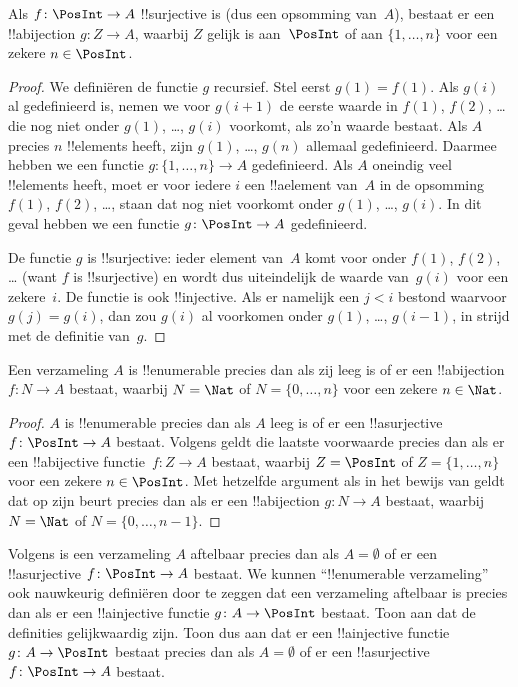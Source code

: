 \documentclass[../../../include/open-logic-section]{subfiles}
\begin{document}
\begin{prop}
Als $f\colon \PosInt \to A$ !!{surjective} is (dus een opsomming
van~$A$), bestaat er een !!a{bijection} $g\colon Z \to A$, waarbij $Z$
gelijk is aan~$\PosInt$ of aan $\{1, \dots, n\}$ voor een zekere
$n \in \PosInt$.
\end{prop}

\begin{proof}
  We definiëren de functie $g$ recursief. Stel eerst $g(1) = f(1)$.
  Als $g(i)$ al gedefinieerd is, nemen we voor $g(i+1)$ de eerste
  waarde in $f(1)$, $f(2)$, \dots{} die nog niet onder $g(1)$, \dots,
  $g(i)$ voorkomt, als zo'n waarde bestaat. Als $A$ precies $n$
  !!{element}s heeft, zijn $g(1)$, \dots, $g(n)$ allemaal gedefinieerd.
  Daarmee hebben we een functie $g\colon \{1, \dots, n\} \to A$
  gedefinieerd. Als $A$ oneindig veel !!{element}s heeft, moet er voor
  iedere $i$ een !!a{element} van~$A$ in de opsomming $f(1)$, $f(2)$,
  \dots, staan dat nog niet voorkomt onder $g(1)$, \dots, $g(i)$.
  In dit geval hebben we een functie $g\colon \PosInt \to A$
  gedefinieerd.
  
  De functie $g$ is !!{surjective}: ieder element van~$A$ komt voor
  onder $f(1)$, $f(2)$, \dots{} (want $f$ is !!{surjective}) en wordt
  dus uiteindelijk de waarde van~$g(i)$ voor een zekere~$i$. De functie
  is ook !!{injective}. Als er namelijk een $j < i$ bestond waarvoor
  $g(j) = g(i)$, dan zou $g(i)$ al voorkomen onder $g(1)$, \dots,
  $g(i-1)$, in strijd met de definitie van~$g$.
\end{proof}

\begin{cor}
Een verzameling $A$ is !!{enumerable} precies dan als zij leeg is of er
een !!a{bijection} $f\colon N \to A$ bestaat, waarbij $N = \Nat$ of
$N = \{0, \dots, n\}$ voor een zekere $n \in \Nat$.
\end{cor}

\begin{proof}
$A$ is !!{enumerable} precies dan als $A$ leeg is of er een
!!a{surjective} $f\colon \PosInt \to A$ bestaat. Volgens
 geldt die laatste voorwaarde precies dan als er
een !!a{bijective} functie~$f\colon Z \to A$ bestaat, waarbij $Z =
\PosInt$ of $Z = \{1, \dots, n\}$ voor een zekere $n \in \PosInt$.
Met hetzelfde argument als in het bewijs van 
geldt dat op zijn beurt precies dan als er een !!a{bijection}
$g\colon N \to A$ bestaat, waarbij $N = \Nat$ of
$N = \{0, \dots, n-1\}$.
\end{proof}

\begin{prob}
  Volgens  is een verzameling $A$
  aftelbaar precies dan als $A = \emptyset$ of er een !!a{surjective}
  $f\colon \PosInt \to A$ bestaat. We kunnen ``!!{enumerable}
  verzameling'' ook nauwkeurig definiëren door te zeggen dat een
  verzameling aftelbaar is precies dan als er een !!a{injective} functie
  $g\colon A \to \PosInt$ bestaat. Toon aan dat de definities
  gelijkwaardig zijn. Toon dus aan dat er een !!a{injective} functie
  $g\colon A \to \PosInt$ bestaat precies dan als $A = \emptyset$ of er
  een !!a{surjective} $f\colon \PosInt \to A$ bestaat.
\end{prob}
\end{document}
